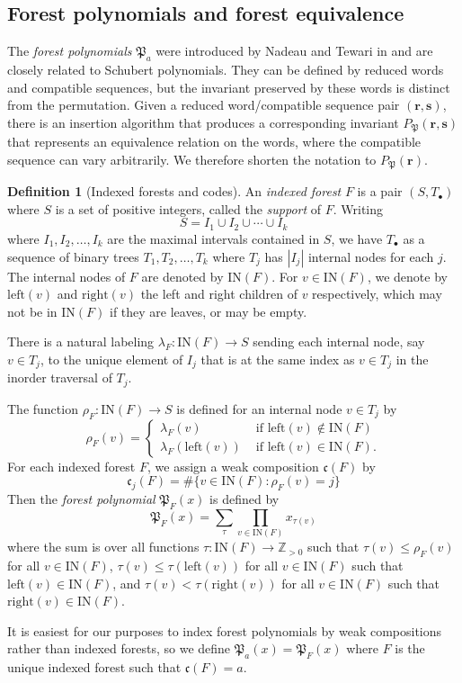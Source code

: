 \documentclass{amsart}
\theoremstyle{definition}
\newtheorem{definition}[lemma]{Definition}
\theoremstyle{remark}
\numberwithin{equation}{subsection}
\newcommand{\code}{\mathfrak{c}}
\newcommand{\forest}{\mathfrak{P}}
\newcommand{\finv}{P_{\forest}}
\begin{document}
\subsection{Forest polynomials and forest equivalence}

The \emph{forest polynomials} $\forest_a$ were introduced by Nadeau and Tewari in \cite{nadeau2024forest} and are closely related to Schubert polynomials. They can be defined by reduced words and compatible sequences, but the invariant preserved by these words is distinct from the permutation. Given a reduced word/compatible sequence pair $(\mathbf{r},\mathbf{s})$, there is an insertion algorithm that produces a corresponding invariant $\finv(\mathbf{r},\mathbf{s})$ that represents an equivalence relation on the words, where the compatible sequence can vary arbitrarily. We therefore shorten the notation to $\finv(\mathbf{r})$.

\begin{definition}[Indexed forests and codes]
  An \emph{indexed forest} $F$ is a pair $(S, T_\bullet)$ where $S$ is a set of positive integers, called the \emph{support} of $F$. Writing
  $$S=I_1\cup I_2\cup \cdots \cup I_k$$
  where $I_1,I_2,\ldots, I_k$ are the maximal intervals contained in $S$, we have $T_\bullet$ as a sequence of binary trees $T_1,T_2,\ldots, T_k$ where $T_j$ has $|I_j|$ internal nodes for each $j$. The internal nodes of $F$ are denoted by $\mathrm{IN}(F)$. For $v\in \mathrm{IN}(F)$, we denote by $\mathrm{left}(v)$ and $\mathrm{right}(v)$ the left and right children of $v$ respectively, which may not be in $\mathrm{IN}(F)$ if they are leaves, or may be empty.

  There is a natural labeling $\lambda_F:\mathrm{IN}(F)\to S$ sending each internal node, say $v\in T_j$, to the unique element of $I_j$ that is at the same index as $v\in T_j$ in the inorder traversal of $T_j$.

  The function $\rho_F:\mathrm{IN}(F)\to S$ is defined for an internal node $v\in T_j$ by
  $$\rho_F(v) = \begin{cases}
  \lambda_F(v)&\mbox{ if }\mathrm{left}(v)\notin\mathrm{IN}(F)\\
  \lambda_F(\mathrm{left}(v))&\mbox{ if }\mathrm{left}(v)\in\mathrm{IN}(F).
  \end{cases}$$
  For each indexed forest $F$, we assign a weak composition $\code(F)$ by
  $$\code_j(F)=\#\{v\in \mathrm{IN}(F): \rho_F(v)=j\}$$
  Then the \emph{forest polynomial} $\forest_F(x)$ is defined by
  $$\forest_F(x) = \sum_{\tau}\prod_{v\in\mathrm{IN}(F)}x_{\tau(v)}$$
  where the sum is over all functions $\tau:\mathrm{IN}(F)\to \mathbb{Z}_{>0}$ such that $\tau(v)\leq \rho_F(v)$ for all $v\in \mathrm{IN}(F)$, $\tau(v)\leq\tau(\mathrm{left}(v))$ for all $v\in \mathrm{IN}(F)$ such that $\mathrm{left}(v)\in \mathrm{IN}(F)$, and $\tau(v)<\tau(\mathrm{right}(v))$ for all $v\in \mathrm{IN}(F)$ such that $\mathrm{right}(v)\in \mathrm{IN}(F)$.

  It is easiest for our purposes to index forest polynomials by weak compositions rather than indexed forests, so we define $\forest_a(x) = \forest_F(x)$ where $F$ is the unique indexed forest such that $\code(F) = a$.
\end{definition}
\end{document}
